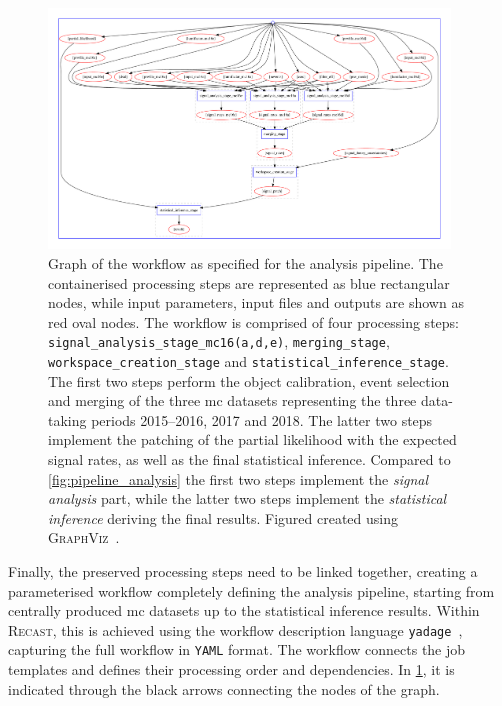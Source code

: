  \begin{figure}
	\centering\includegraphics[width=0.95\textwidth]{yadage_workflow_instance}
	\caption{Graph of the workflow as specified for the analysis pipeline. The containerised processing steps are represented as blue rectangular nodes, while input parameters, input files and outputs are shown as red oval nodes. The workflow is comprised of four processing steps: \texttt{signal\_analysis\_stage\_mc16(a,d,e)}, \texttt{merging\_stage}, \texttt{workspace\_creation\_stage} and \texttt{statistical\_inference\_stage}. The first two steps perform the object calibration, event selection and merging of the three \gls{mc} datasets representing the three data-taking periods 2015--2016, 2017 and 2018. The latter two steps implement the patching of the partial likelihood with the expected signal rates, as well as the final statistical inference. Compared to \cref{fig:pipeline_analysis} the first two steps implement the \textit{signal analysis} part, while the latter two steps implement the \textit{statistical inference} deriving the final results. Figured created using \textsc{GraphViz}~\cite{Gansner00anopen,neato}.} 
	\label{fig:recast_workflow}
\end{figure}


Finally, the preserved processing steps need to be linked together, creating a parameterised workflow completely defining the analysis pipeline, starting from centrally produced \gls{mc} datasets up to the statistical inference results. Within \textsc{Recast}, this is achieved using the workflow description language \texttt{yadage}~\cite{yadage:2017frf}, capturing the full workflow in \texttt{YAML} format. The workflow connects the job templates and defines their processing order and dependencies. In \cref{fig:recast_workflow}, it is indicated through the black arrows connecting the nodes of the graph.

